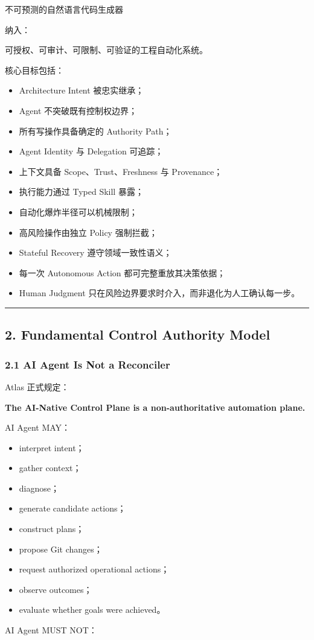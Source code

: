 \documentclass[11pt,a4paper]{article}
\begin{document}
\begin{gfmBlockquote}
不可预测的自然语言代码生成器
\end{gfmBlockquote}
纳入：

\begin{gfmBlockquote}
可授权、可审计、可限制、可验证的工程自动化系统。
\end{gfmBlockquote}
核心目标包括：

\begin{itemize}
  \item Architecture Intent 被忠实继承；
  \item Agent 不突破既有控制权边界；
  \item 所有写操作具备确定的 Authority Path；
  \item Agent Identity 与 Delegation 可追踪；
  \item 上下文具备 Scope、Trust、Freshness 与 Provenance；
  \item 执行能力通过 Typed Skill 暴露；
  \item 自动化爆炸半径可以机械限制；
  \item 高风险操作由独立 Policy 强制拦截；
  \item Stateful Recovery 遵守领域一致性语义；
  \item 每一次 Autonomous Action 都可完整重放其决策依据；
  \item Human Judgment 只在风险边界要求时介入，而非退化为人工确认每一步。
\end{itemize}
\vspace{0.5em}\hrule\vspace{0.5em}
\subsection{2. Fundamental Control Authority Model}
\subsubsection{2.1 AI Agent Is Not a Reconciler}
Atlas 正式规定：

\begin{gfmBlockquote}
\textbf{The AI-Native Control Plane is a non-authoritative automation plane.}
\end{gfmBlockquote}
AI Agent MAY：

\begin{itemize}
  \item interpret intent；
  \item gather context；
  \item diagnose；
  \item generate candidate actions；
  \item construct plans；
  \item propose Git changes；
  \item request authorized operational actions；
  \item observe outcomes；
  \item evaluate whether goals were achieved。
\end{itemize}
AI Agent MUST NOT：
\end{document}
